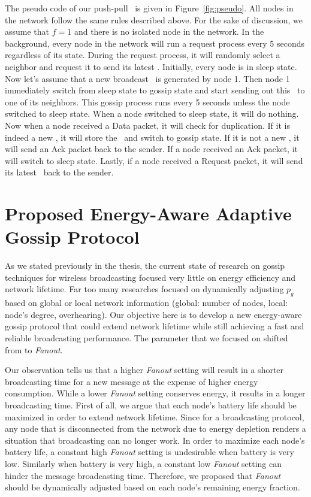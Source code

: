 The pseudo code of our push-pull \gp ~is given in Figure~\ref{fig:pseudo}. All nodes in the network follow the same rules described above. For the sake of discussion, we assume that $f=1$ and there is no isolated node in the network. In the background, every node in the network will run a request process every 5 seconds regardless of its state. During the request process, it will randomly select a neighbor and request it to send its latest \msg. Initially, every node is in sleep state. Now let's assume that a new broadcast \msg ~is generated by node 1. Then node 1 immediately switch from sleep state to gossip state and start sending out this \msg ~to one of its neighbors. This gossip process runs every 5 seconds unless the node switched to sleep state. When a node switched to sleep state, it will do nothing. Now when a node received a Data packet, it will check for duplication. If it is indeed a new \msg, it will store the \msg ~and switch to gossip state. If it is not a new \msg, it will send an Ack packet back to the sender. If a node received an Ack packet, it will switch to sleep state. Lastly, if a node received a Request packet, it will send its latest \msg ~back to the sender. 

\section{Proposed Energy-Aware Adaptive Gossip Protocol}
As we stated previously in the thesis, the current state of research on gossip techniques for wireless broadcasting focused very little on energy efficiency and network lifetime. Far too many researches focused on dynamically adjusting $p_g$ based on global or local network information (global: number of nodes, local: node's degree, overhearing). Our objective here is to develop a new energy-aware gossip protocol that could extend network lifetime while still achieving a fast and reliable broadcasting performance. The parameter that we focused on shifted from \emph{\pog} to \emph{Fanout}.

Our observation tells us that a higher \emph{Fanout} setting will result in a shorter broadcasting time for a new message at the expense of higher energy consumption. While a lower \emph{Fanout} setting conserves energy, it results in a longer broadcasting time. First of all, we argue that each node's battery life should be maximized in order to extend network lifetime. Since for a broadcasting protocol, any node that is disconnected from the network due to energy depletion renders a situation that broadcasting can no longer work. In order to maximize each node's battery life, a constant high \emph{Fanout} setting is undesirable when battery is very low. Similarly when battery is very high, a constant low \emph{Fanout} setting can hinder the message broadcasting time. Therefore, we proposed that \emph{Fanout} should be dynamically adjusted based on each node's remaining energy fraction. 

